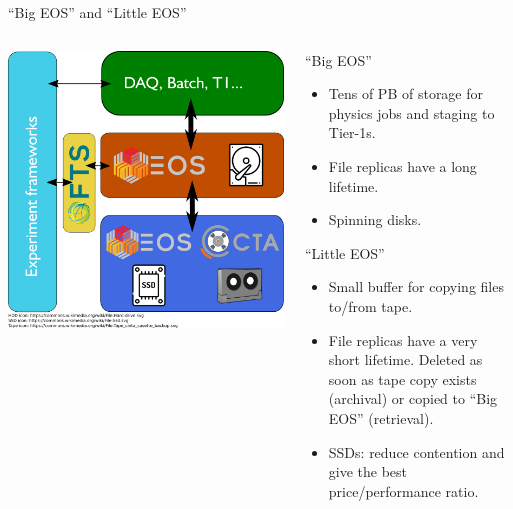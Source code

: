 \documentclass{beamer}
\begin{document}
\begin{frame}{``Big EOS'' and ``Little EOS''}
\begin{columns}
	\begin{column}{0.4\textwidth}
		\begin{center}
		  \includegraphics[width=\textwidth]{images/CTA_Deployment_model.pdf}
		\end{center}
	\end{column}
	\begin{column}{0.55\textwidth}
      ``Big EOS''
      {\small
\begin{itemize}
        \item Tens of PB of storage for physics jobs and staging to Tier-1s.
        \item File replicas have a long lifetime.
        \item Spinning disks.
\end{itemize}
      }
      ``Little EOS''
      {\small
		\begin{itemize}
        \item Small buffer for copying files to/from tape.
        \item File replicas have a very short lifetime. Deleted as soon as tape copy exists (archival) or
           copied to ``Big EOS'' (retrieval).
        \item SSDs: reduce contention and give the best price/performance ratio.
		\end{itemize}
      }
	\end{column}
\end{columns}
\end{frame}
\end{document}
